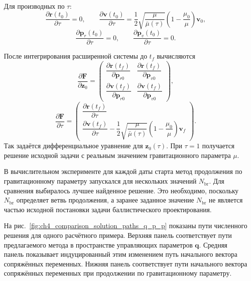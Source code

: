 Для производных по \(\tau\):
\begin{equation}
	\frac{\partial \mathbf r(t_0)}{\partial \tau}=0,
	\qquad
	\frac{\partial \mathbf v(t_0)}{\partial \tau}
	=
	\frac{1}{2}
	\sqrt{\frac{\mu}{\bar\mu(\tau)}}
	\left(1-\frac{\mu_0}{\mu}\right)
	\mathbf v_0,
\end{equation}
\begin{equation}
	\frac{\partial \mathbf p_r(t_0)}{\partial \tau}=0,
	\qquad
	\frac{\partial \mathbf p_v(t_0)}{\partial \tau}=0.
\end{equation}

После интегрирования расширенной системы до \(t_f\) вычисляются
\begin{equation}
	\frac{\partial \mathbf F}{\partial \mathbf z_0}
	=
	\begin{pmatrix}
		\dfrac{\partial \mathbf r(t_f)}{\partial \mathbf p_{r0}} &
		\dfrac{\partial \mathbf r(t_f)}{\partial \mathbf p_{v0}}\\[1.0ex]
		\dfrac{\partial \mathbf v(t_f)}{\partial \mathbf p_{r0}} &
		\dfrac{\partial \mathbf v(t_f)}{\partial \mathbf p_{v0}}
	\end{pmatrix},
\end{equation}
\begin{equation}
	\frac{\partial \mathbf F}{\partial \tau}
	=
	\begin{pmatrix}
		\dfrac{\partial \mathbf r(t_f)}{\partial \tau}\\[1.0ex]
		\dfrac{\partial \mathbf v(t_f)}{\partial \tau}
		-
		\dfrac{1}{2}
		\sqrt{\dfrac{\mu}{\bar\mu(\tau)}}
		\left(1-\dfrac{\mu_0}{\mu}\right)\mathbf v_f
	\end{pmatrix}.
\end{equation}
Так задаётся дифференциальное уравнение для \(\mathbf z_0(\tau)\). При \(\tau=1\) получается решение исходной задачи с реальным значением гравитационного параметра \(\mu\).

В вычислительном эксперименте для каждой даты старта метод продолжения по гравитационному параметру запускался для нескольких значений \(N_{\mathrm{br}}\). Для сравнения выбиралось лучшее найденное решение. Это необходимо, поскольку \(N_{\mathrm{br}}\) определяет ветвь продолжения, а заранее заданное значение \(N_{\mathrm{br}}\) не является частью исходной постановки задачи баллистического проектирования.

На рис.~\ref{fig:ch4_comparison_solution_paths_q_p_p} показаны пути численного решения для одного расчётного примера. Верхняя панель соответствует пути предлагаемого метода в пространстве управляющих параметров \(\mathbf q\). Средняя панель показывает индуцированный этим изменением путь начального вектора сопряжённых переменных. Нижняя панель соответствует пути начального вектора сопряжённых переменных при продолжении по гравитационному параметру.

